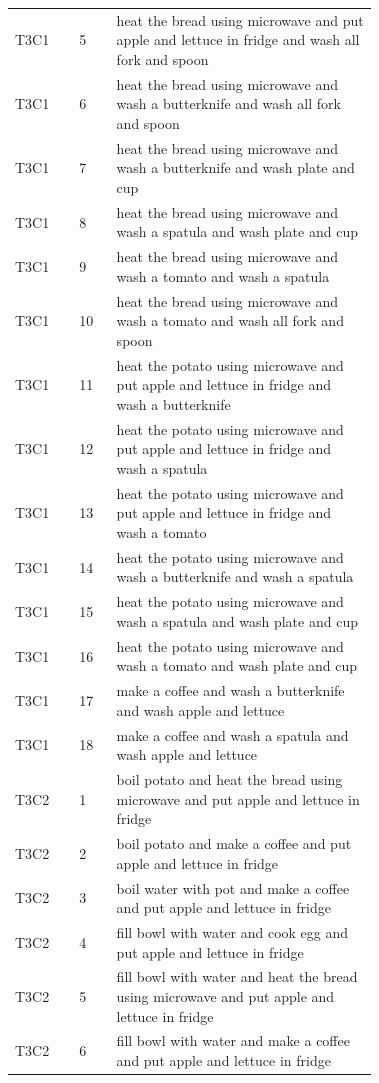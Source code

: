 \documentclass[letterpaper,10pt,onecolumn]{IEEEtran}
\begin{document}
{\begin{longtable}{@{}llp{0.72\linewidth}@{}}
T3C1 & 5 & heat the bread using microwave and put apple and lettuce in fridge and wash all fork and spoon \\
T3C1 & 6 & heat the bread using microwave and wash a butterknife and wash all fork and spoon \\
T3C1 & 7 & heat the bread using microwave and wash a butterknife and wash plate and cup \\
T3C1 & 8 & heat the bread using microwave and wash a spatula and wash plate and cup \\
T3C1 & 9 & heat the bread using microwave and wash a tomato and wash a spatula \\
T3C1 & 10 & heat the bread using microwave and wash a tomato and wash all fork and spoon \\
T3C1 & 11 & heat the potato using microwave and put apple and lettuce in fridge and wash a butterknife \\
T3C1 & 12 & heat the potato using microwave and put apple and lettuce in fridge and wash a spatula \\
T3C1 & 13 & heat the potato using microwave and put apple and lettuce in fridge and wash a tomato \\
T3C1 & 14 & heat the potato using microwave and wash a butterknife and wash a spatula \\
T3C1 & 15 & heat the potato using microwave and wash a spatula and wash plate and cup \\
T3C1 & 16 & heat the potato using microwave and wash a tomato and wash plate and cup \\
T3C1 & 17 & make a coffee and wash a butterknife and wash apple and lettuce \\
T3C1 & 18 & make a coffee and wash a spatula and wash apple and lettuce \\
\midrule
T3C2 & 1 & boil potato and heat the bread using microwave and put apple and lettuce in fridge \\
T3C2 & 2 & boil potato and make a coffee and put apple and lettuce in fridge \\
T3C2 & 3 & boil water with pot and make a coffee and put apple and lettuce in fridge \\
T3C2 & 4 & fill bowl with water and cook egg and put apple and lettuce in fridge \\
T3C2 & 5 & fill bowl with water and heat the bread using microwave and put apple and lettuce in fridge \\
T3C2 & 6 & fill bowl with water and make a coffee and put apple and lettuce in fridge \\

\end{longtable}}
\end{document}
